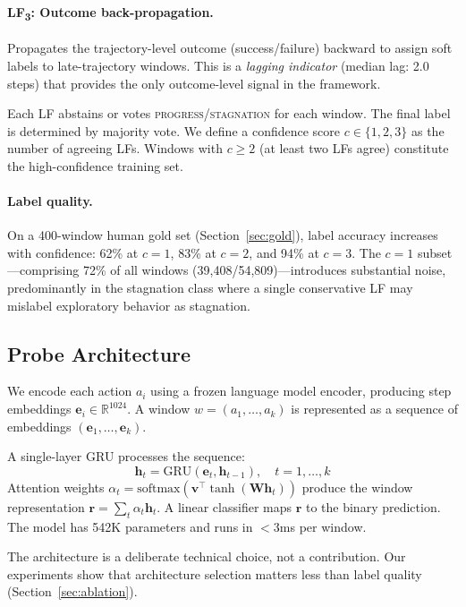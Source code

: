 \documentclass[11pt]{article}
\begin{document}
\paragraph{LF\textsubscript{3}: Outcome back-propagation.}
Propagates the trajectory-level outcome (success/failure) backward to assign soft labels to late-trajectory windows. This is a \emph{lagging indicator} (median lag: 2.0 steps) that provides the only outcome-level signal in the framework.

Each LF abstains or votes \textsc{progress}/\textsc{stagnation} for each window. The final label is determined by majority vote. We define a confidence score $c \in \{1, 2, 3\}$ as the number of agreeing LFs. Windows with $c \geq 2$ (at least two LFs agree) constitute the high-confidence training set.

\paragraph{Label quality.}
On a 400-window human gold set (Section~\ref{sec:gold}), label accuracy increases with confidence: 62\% at $c{=}1$, 83\% at $c{=}2$, and 94\% at $c{=}3$. The $c{=}1$ subset---comprising 72\% of all windows (39,408/54,809)---introduces substantial noise, predominantly in the stagnation class where a single conservative LF may mislabel exploratory behavior as stagnation.

\subsection{Probe Architecture}

We encode each action $a_i$ using a frozen language model encoder, producing step embeddings $\mathbf{e}_i \in \mathbb{R}^{1024}$. A window $w = (a_1, \ldots, a_k)$ is represented as a sequence of embeddings $(\mathbf{e}_1, \ldots, \mathbf{e}_k)$.

A single-layer GRU processes the sequence:
\begin{equation}
  \mathbf{h}_t = \text{GRU}(\mathbf{e}_t, \mathbf{h}_{t-1}), \quad t = 1, \ldots, k
\end{equation}
Attention weights $\alpha_t = \text{softmax}(\mathbf{v}^\top \tanh(\mathbf{W}\mathbf{h}_t))$ produce the window representation $\mathbf{r} = \sum_t \alpha_t \mathbf{h}_t$. A linear classifier maps $\mathbf{r}$ to the binary prediction. The model has 542K parameters and runs in $<$3ms per window.

The architecture is a deliberate technical choice, not a contribution. Our experiments show that architecture selection matters less than label quality (Section~\ref{sec:ablation}).
\end{document}

